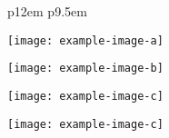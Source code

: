 \begin{center}
\begin{minipage}[t]{.52\linewidth}
{\begin{tabular}{p{12em} p{9.5em}}
        \end{tabular}
        }
	\end{minipage}\hfill
\end{center}       

\vspace{2em}

\begin{center} %
	\begin{minipage}[c]{.25\linewidth}
		\centering\texttt{[image: example-image-a]} 
	\end{minipage}\hfill
	\begin{minipage}[c]{.25\linewidth}
		\centering\texttt{[image: example-image-b]}
	\end{minipage}\hfill
	\begin{minipage}[c]{.25\linewidth}
		\centering\texttt{[image: example-image-c]} 
	\end{minipage}\hfill
	\begin{minipage}[c]{.25\linewidth}
		\centering\texttt{[image: example-image-c]}
	\end{minipage}\hfill
\end{center}

\restoregeometry
